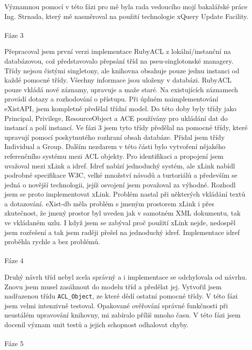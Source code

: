 Významnou pomocí v této fázi pro mě byla rada vedoucího mojí bakalářské práce Ing. Strnada, který mě nasměroval na použití technologie xQuery Update Facility.
\\
\\
\noindent Fáze 3

\noindent Přepracoval jsem první verzi implementace RubyACL z lokální/instanční na databázovou, což představovalo přepsání tříd na pseu-singlotonské managery. Třídy nejsou čistými singletony, ale knihovna obsahuje pouze jednu instanci od každé pomocné třídy. Všechny informace jsou uloženy v databázi. RubyACL pouze vkládá nové záznamy, upravuje a maže staré. Na existujících záznamech provádí dotazy a rozhodování o přístupu. Při úplném naimplementování eXistAPI, jsem kompletně předělal třídní model. Do této doby byly třídy jako Principal, Privilege, ResourceObject a ACE používány pro ukládání dat do instancí a polí instancí. Ve fázi 3 jsem tyto třídy předělal na pomocné třídy, které upravují pomocí poskytnutého rozhraní obsah databáze. Přidal jsem třídy Individual a Group. Dalším nezdarem v této části bylo vytvoření nějakého referenčního systému mezi ACL objekty.  Pro identifikaci a propojení jsem uvažoval mezi xLink a idref. Idref nabízí jednoduchý systém, ale xLink nabídl podrobné specifikace W3C, velké množství návodů a turtoriálů a především se jedná o novější technologii, jejíž osvojení jsem považoval za výhodné. Rozhodl jsem se proto implementovat xLink. Problém nastal při některých vkládání textů a dotazování. eXist-db měla problém s jmeným prostorem xLink i přes zkutečnost, že jmený prostor byl uveden jak v samotném XML dokumentu, tak ve vkládaném uzlu. I když jsem se zabýval proč použití xLink nejde, nedospěl jsem rozřešení a tak jsem raději přešel na jednoduchý idref. Implementace idref proběhla rychle a bez problémů.
\\
\\
\noindent Fáze 4

\noindent Druhý návrh tříd nebyl zcela správný a i implementace se odchylovala od návrhu. Znovu jsem musel zasáhnout do modelu tříd a předělat jej. Vytvořil jsem nadřazenou třídu \verb|ACL_Object|, ze které dědí ostatní pomocné třídy. V této fázi jsem velmi intenzivně testoval. Opakované ověřování správné funkčnosti při neustálém upravování knihovny, mi zabíralo příliš mnoho času. V této fázi jsem docenil význam unit testů a jejich schopnost odhalovat chyby.
\\
\\
\noindent Fáze 5

